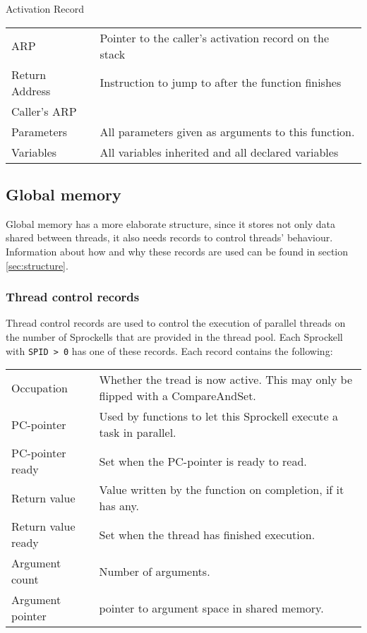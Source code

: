 \documentclass[10pt,a4paper]{report}
\begin{document}
\label{fig:actrecord}
Activation Record
 
\begin{tabular}{| l | l |}
\hline
	ARP
		& Pointer to the caller's activation record on the stack \\	

	Return Address
		& Instruction to jump to after the function finishes \\
	
	Caller's ARP 	
		& \\
	
	Parameters 
		& All parameters given as arguments to this function. \\
	
	Variables 
		& All variables inherited and all declared variables \\	
\hline
\end{tabular}

\subsection{Global memory}
Global memory has a more elaborate structure, since it stores not only data shared between threads, it also needs records to control threads' behaviour. Information about how and why these records are used can be found in section \ref{sec:structure}. 

\subsubsection{Thread control records}
Thread control records are used to control the execution of parallel threads on the number of Sprockells that are provided in the thread pool. Each Sprockell with \texttt{SPID > 0} has one of these records. Each record contains the following:

\begin{tabular}{| l | l |}
\hline
Occupation 
	& Whether the tread is now active. This may only be flipped with a CompareAndSet. \\
PC-pointer 
	& Used by functions to let this Sprockell execute a task in parallel. \\
PC-pointer ready 
	& Set when the PC-pointer is ready to read. \\
Return value 
	& Value written by the function on completion, if it has any. \\
Return value ready 
	& Set when the thread has finished execution. \\
Argument count 
	& Number of arguments. \\
Argument pointer 
	& pointer to argument space in shared memory. \\ 
\hline
\end{tabular}
\end{document}
